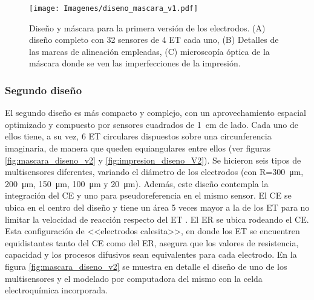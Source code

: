 					\begin{figure}[h!]
		 	       	\texttt{[image: Imagenes/diseno\_mascara\_v1.pdf]}
 		       		\caption[Primer diseño y máscara de los sensores]{Diseño y máscara para la primera versión de los electrodos. (A) diseño completo con 32 sensores de 4 ET cada uno, (B) Detalles de las marcas de alineación empleadas, (C) microscopía óptica de la máscara donde se ven las imperfecciones de la impresión.}
 		         	\label{fig:diseno_mascara_v1}
 		     		\end{figure}

		\subsubsection{Segundo diseño}

		 	 El segundo diseño es más compacto y complejo, con un aprovechamiento espacial optimizado y compuesto por sensores cuadrados de \SI{1}{\cm} de lado. Cada uno de ellos tiene, a su vez, 6 ET circulares dispuestos sobre una circunferencia imaginaria, de manera que queden equiangulares entre ellos (ver figuras \ref{fig:mascara_diseno_v2} y \ref{fig:impresion_diseno_V2}). Se hicieron seis tipos de multisensores diferentes, variando el diámetro de los electrodos (con R=\SI{300}{\um}, \SI{200}{\um}, \SI{150}{\um}, \SI{100}{\um} y \SI{20}{\um}). Además, este diseño contempla la integración del CE y uno para pseudoreferencia en el mismo sensor. El CE se ubica en el centro del diseño y tiene un área 5 veces mayor a la de los ET para no limitar la velocidad de reacción respecto del ET \cite{Wi2000}. El ER se ubica rodeando el CE. Esta configuración de <<electrodos calesita>>, en donde los ET se encuentren equidistantes tanto del CE como del ER, asegura que los valores de resistencia, capacidad y los procesos difusivos sean equivalentes para cada electrodo.\cite{Bockris1974}  En la figura \ref{fig:mascara_diseno_v2} se muestra en detalle el diseño de uno de los multisensores y el modelado por computadora del mismo con la celda electroquímica incorporada. 

